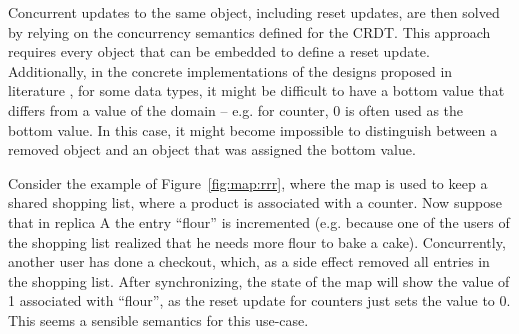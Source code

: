 \documentclass[12pt]{article}
\begin{document}
Concurrent updates to the same object, including reset updates, are 
then solved by relying on the concurrency semantics defined for the CRDT.
This approach requires every object that can be embedded to define a reset 
update.
Additionally, in the concrete implementations 
of the designs proposed in literature \cite{Brown14Riak,DBLP:journals/jpdc/AlmeidaSB18}, 
for some data types, it might be difficult to have a bottom value that differs
from a value of the domain -- e.g. for counter, 0 is often used as the bottom value.
In this case, it might become impossible to distinguish between a removed object 
and an object that was assigned the bottom value.

Consider the example of Figure~\ref{fig:map:rrr}, where the map is used to 
keep a shared shopping list, where a product is associated with a counter.
Now suppose that in replica A the entry ``flour'' is incremented (e.g. because one 
of the users of the shopping list realized that he needs more flour to bake a cake).
Concurrently, another user has done a checkout, which, as a side effect removed all
entries in the shopping list.
After synchronizing, the state of the map will show the value of 1 associated with 
``flour'', as the reset update for counters just sets the value to 0. 
This seems a sensible semantics for this use-case.

\end{document}
